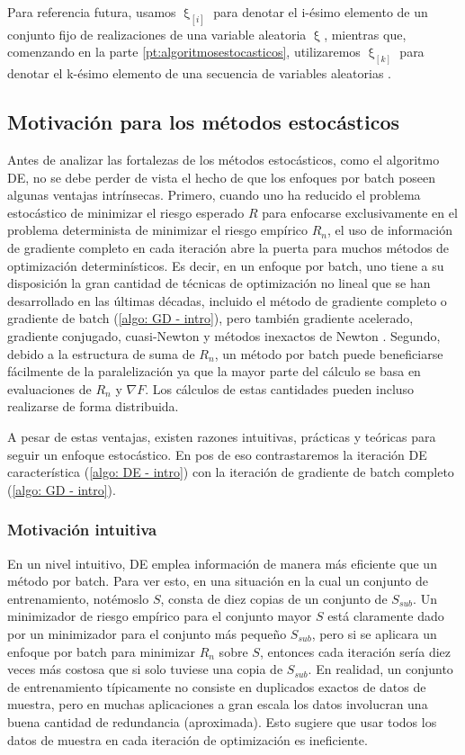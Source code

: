 Para referencia futura, usamos $\upxi_{\left [ i \right ]}$ para denotar el i-\'esimo elemento de un conjunto fijo de realizaciones de una variable aleatoria $\upxi$, mientras que, comenzando en la parte \ref{pt:algoritmosestocasticos}, utilizaremos $\upxi_{\left [ k \right ]}$ para denotar el k-\'esimo elemento de una secuencia de variables aleatorias .

\subsection{Motivaci\'on para los m\'etodos estoc\'asticos}
Antes de analizar las fortalezas de los m\'etodos estoc\'asticos, como el algoritmo DE, no se debe perder de vista el hecho de que los enfoques por batch poseen algunas ventajas intr\'insecas. Primero, cuando uno ha reducido el problema estoc\'astico de minimizar el riesgo esperado $R$ para enfocarse exclusivamente en el problema determinista de minimizar el riesgo emp\'irico $R_n$, el uso de informaci\'on de gradiente completo en cada iteraci\'on abre la puerta para muchos m\'etodos de optimizaci\'on determin\'isticos. Es decir, en un enfoque por batch, uno tiene a su disposici\'on la gran cantidad de t\'ecnicas de optimizaci\'on no lineal que se han desarrollado en las \'ultimas d\'ecadas, incluido el m\'etodo de gradiente completo o gradiente de batch (\ref{algo: GD - intro}), pero tambi\'en gradiente acelerado, gradiente conjugado, cuasi-Newton y m\'etodos inexactos de Newton \cite{nocedal:2006}. Segundo, debido a la estructura de suma de $R_n$, un m\'etodo por batch puede beneficiarse f\'acilmente de la paralelizaci\'on ya que la mayor parte del c\'alculo se basa en evaluaciones de $R_n$ y $\nabla F$. Los c\'alculos de estas cantidades pueden incluso realizarse de forma distribuida.

A pesar de estas ventajas, existen razones intuitivas, pr\'acticas y te\'oricas para seguir un enfoque estoc\'astico. En pos de eso contrastaremos la iteraci\'on DE caracter\'istica (\ref{algo: DE - intro}) con la iteraci\'on de gradiente de batch completo (\ref{algo: GD - intro}).

\subsubsection{Motivación intuitiva}

En un nivel intuitivo, DE emplea información de manera más eficiente que un método por batch. Para ver esto, en una situación en la cual un conjunto de entrenamiento, not\'emoslo $S$, consta de diez copias de un conjunto de $S_{sub}$. Un minimizador de riesgo empírico para el conjunto mayor $S$ está claramente dado por un minimizador para el conjunto más pequeño $S_{sub}$, pero si se aplicara un enfoque por batch para minimizar $R_n$ sobre $S$, entonces cada iteración sería diez veces más costosa que si solo tuviese una copia de $S_{sub}$. En realidad, un conjunto de entrenamiento típicamente no consiste en duplicados exactos de datos de muestra, pero en muchas aplicaciones a gran escala los datos involucran una buena cantidad de redundancia (aproximada). Esto sugiere que usar todos los datos de muestra en cada iteración de optimización es ineficiente.

